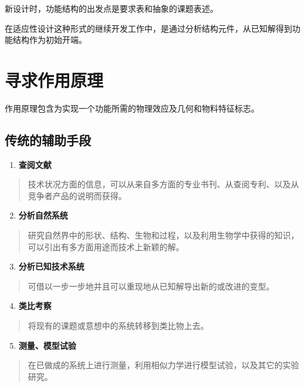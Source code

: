 \documentclass[letterpaper,10pt,english]{sphinxmanual}
\begin{document}
新设计时，功能结构的出发点是要求表和抽象的课题表述。

在适应性设计这种形式的继续开发工作中，是通过分析结构元件，从已知解得到功能结构作为初始开端。


\section{寻求作用原理}
\label{unit5:id13}
作用原理包含为实现一个功能所需的物理效应及几何和物料特征标志。


\subsection{传统的辅助手段}
\label{unit5:id14}\begin{enumerate}
\item {} 
\textbf{查阅文献}

\end{enumerate}
\begin{quote}

技术状况方面的信息，可以从来自多方面的专业书刊、从查阅专利、以及从竞争者产品的说明而获得。
\end{quote}
\begin{enumerate}
\setcounter{enumi}{1}
\item {} 
\textbf{分析自然系统}

\end{enumerate}
\begin{quote}

研究自然界中的形状、结构、生物和过程，以及利用生物学中获得的知识，可以引出有多方面用途而技术上新颖的解。
\end{quote}
\begin{enumerate}
\setcounter{enumi}{2}
\item {} 
\textbf{分析已知技术系统}

\end{enumerate}
\begin{quote}

可借以一步一步地并且可以重现地从已知解导出新的或改进的变型。
\end{quote}
\begin{enumerate}
\setcounter{enumi}{3}
\item {} 
\textbf{类比考察}

\end{enumerate}
\begin{quote}

将现有的课题或意想中的系统转移到类比物上去。
\end{quote}
\begin{enumerate}
\setcounter{enumi}{4}
\item {} 
\textbf{测量、模型试验}

\end{enumerate}
\begin{quote}

在已做成的系统上进行测量，利用相似力学进行模型试验，以及其它的实验研究。
\end{quote}
\end{document}
